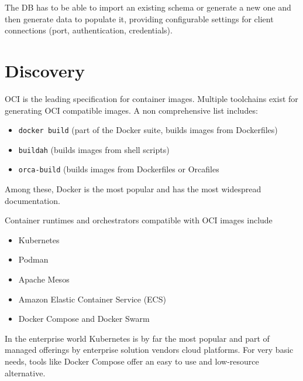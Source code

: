 \documentclass[12pt, letterpaper, twoside]{article}
\begin{document}
The DB has to be able to import an existing schema or generate a new one and then generate data to populate it, providing configurable settings for client connections (port, authentication, credentials).

\section{Discovery}
\label{sec:discovery}

OCI is the leading specification for container images. Multiple toolchains exist for generating OCI compatible images. A non comprehensive list includes:
\begin{itemize}
    \item \verb|docker build| (part of the Docker suite, builds images from Dockerfiles)
    \item \verb|buildah| (builds images from shell scripts)
    \item \verb|orca-build| (builds images from Dockerfiles or Orcafiles
\end{itemize}
Among these, Docker is the most popular and has the most widespread documentation.

Container runtimes and orchestrators compatible with OCI images include
\begin{itemize}
    \item Kubernetes
    \item Podman
    \item Apache Mesos
    \item Amazon Elastic Container Service (ECS)
    \item Docker Compose and Docker Swarm
\end{itemize}
In the enterprise world Kubernetes is by far the most popular and part of managed offerings by enterprise solution vendors cloud platforms. For very basic needs, tools like Docker Compose offer an easy to use and low-resource alternative.
\end{document}
